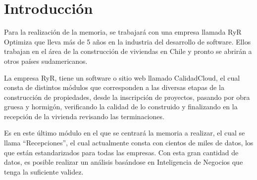 \documentclass[letter,12pt,oneside]{report}
\newenvironment{dedication}
{
   \cleardoublepage
   \vspace*{\stretch{8}}
   \hfill\begin{minipage}[t]{0.66\textwidth}
   \raggedright
}%
{
   \end{minipage}
   \clearpage
}
\renewcommand{\abstractnamefont}{\normalfont\Large\bfseries}
\renewcommand{\abstractname}{Agradecimientos}
\begin{document}
\newpage
\thispagestyle{fancyplain}
\setcounter{page}{1}

\newpage
\renewcommand{\contentsname}{Índice General}
\tableofcontents
\listoffigures

\newpage
\thispagestyle{fancyplain}
\chapter{Introducción}
Para la realización de la memoria, se trabajará con una empresa llamada RyR Optimiza que lleva más de 5 años en la industria del desarrollo de software. Ellos trabajan en el área de la construcción de viviendas en Chile y pronto se abrirán a otros países sudamericanos.

La empresa RyR, tiene un software o sitio web llamado CalidadCloud, el cual consta de distintos módulos que corresponden a las diversas etapas de la construcción de propiedades, desde la inscripción de proyectos, pasando por obra gruesa y hormigón, verificando la calidad de lo construido y finalizando en la recepción de la vivienda revisando las terminaciones.

Es en este último módulo en el que se centrará la memoria a realizar, el cual se llama “Recepciones”, el cual actualmente consta con cientos de miles de datos, los que están estandarizados para todas las empresas. Con esta gran cantidad de datos, es posible realizar un análisis basándose en Inteligencia de Negocios que tenga la suficiente validez.
\end{document}
